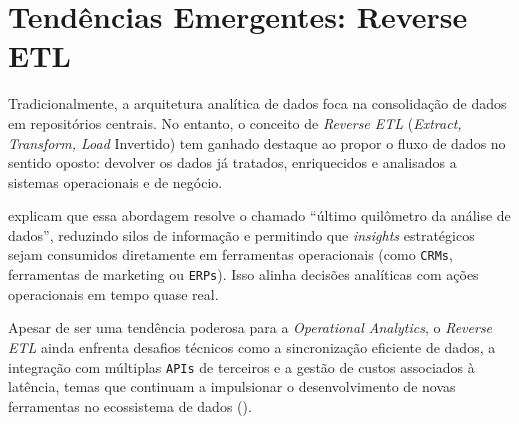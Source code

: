 \section{Tendências Emergentes: Reverse ETL}
\label{sec:reverse_etl}

Tradicionalmente, a arquitetura analítica de dados foca na consolidação de dados em repositórios centrais. No entanto, o conceito de \textit{Reverse ETL} (\textit{Extract, Transform, Load} Invertido) tem ganhado destaque ao propor o fluxo de dados no sentido oposto: devolver os dados já tratados, enriquecidos e analisados a sistemas operacionais e de negócio.

\cite[]{reverseetl2022} explicam que essa abordagem resolve o chamado “último quilômetro da análise de dados”, reduzindo silos de informação e permitindo que \textit{insights} estratégicos sejam consumidos diretamente em ferramentas operacionais (como \texttt{CRMs}, ferramentas de marketing ou \texttt{ERPs}). Isso alinha decisões analíticas com ações operacionais em tempo quase real.

Apesar de ser uma tendência poderosa para a \textit{Operational Analytics}, o \textit{Reverse ETL} ainda enfrenta desafios técnicos como a sincronização eficiente de dados, a integração com múltiplas \texttt{APIs} de terceiros e a gestão de custos associados à latência, temas que continuam a impulsionar o desenvolvimento de novas ferramentas no ecossistema de dados (\cite[]{reverseetl2022}).


